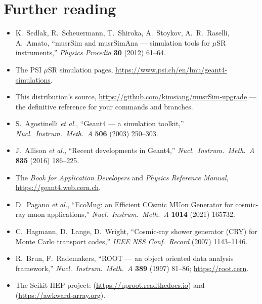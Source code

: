 \chapter{Further reading}
\label{app:reading}

\begin{itemize}
  \item K.~Sedlak, R.~Scheuermann, T.~Shiroka, A.~Stoykov, A.~R.~Raselli, A.~Amato, ``musrSim and musrSimAna --- simulation tools for \(\mu\)SR instruments,'' \emph{Physics Procedia} \textbf{30} (2012) 61--64.
  \item The PSI \(\mu\)SR simulation pages, \url{https://www.psi.ch/en/lmu/geant4-simulations}.
  \item This distribution's source, \url{https://github.com/kimsiang/musrSim-upgrade} --- the definitive reference for your commands and branches.
\end{itemize}

\begin{itemize}
  \item S.~Agostinelli \emph{et al.}, ``Geant4 --- a simulation toolkit,'' \emph{Nucl.\ Instrum.\ Meth.\ A} \textbf{506} (2003) 250--303.
  \item J.~Allison \emph{et al.}, ``Recent developments in Geant4,'' \emph{Nucl.\ Instrum.\ Meth.\ A} \textbf{835} (2016) 186--225.
  \item The \emph{Book for Application Developers} and \emph{Physics Reference Manual}, \url{https://geant4.web.cern.ch}.
\end{itemize}

\begin{itemize}
  \item D.~Pagano \emph{et al.}, ``EcoMug: an Efficient COsmic MUon Generator for cosmic-ray muon applications,'' \emph{Nucl.\ Instrum.\ Meth.\ A} \textbf{1014} (2021) 165732.
  \item C.~Hagmann, D.~Lange, D.~Wright, ``Cosmic-ray shower generator (CRY) for Monte Carlo transport codes,'' \emph{IEEE NSS Conf.\ Record} (2007) 1143--1146.
\end{itemize}

\begin{itemize}
  \item R.~Brun, F.~Rademakers, ``ROOT --- an object oriented data analysis framework,'' \emph{Nucl.\ Instrum.\ Meth.\ A} \textbf{389} (1997) 81--86; \url{https://root.cern}.
  \item The Scikit-HEP project:  (\url{https://uproot.readthedocs.io}) and  (\url{https://awkward-array.org}).
\end{itemize}

